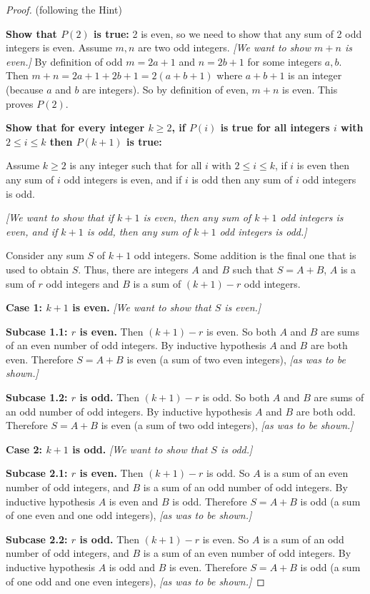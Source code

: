 \documentclass[14pt]{extarticle}
\begin{document}
\begin{proof}
(following the Hint)

{\bf Show that $P(2)$ is true:} 2 is even, so we need to show that any sum of 2 odd integers is even. Assume $m, n$ are two odd integers. 
{\it [We want to show $m+n$ is even.]} 
By definition of odd $m = 2a+1$ and $n = 2b+1$ for some integers $a,b$. 
Then $m+n = 2a+1 + 2b + 1 = 2(a+b+1)$ where $a+b+1$ is an integer (because $a$ and $b$ are integers). 
So by definition of even, $m+n$ is even. This proves $P(2)$.

{\bf Show that for every integer $k \geq 2$, if $P(i)$ is true for all integers $i$ with $2 \leq i \leq k$ then $P(k+1)$ is true:}

Assume $k \geq 2$ is any integer such that for all $i$ with $2 \leq i \leq k$, if $i$ is even then any sum of $i$ odd integers is even, and if $i$ is odd then any sum of $i$ odd integers is odd.

{\it [We want to show that if $k+1$ is even, then any sum of $k+1$ odd integers is even, and if $k+1$ is odd, then any sum of $k+1$ odd integers is odd.]}

Consider any sum $S$ of $k+1$ odd integers.
Some addition is the final one that is used to obtain $S$.
Thus, there are integers $A$ and $B$ such that $S = A + B$,
$A$ is a sum of $r$ odd integers and $B$ is a sum of $(k + 1) - r$ odd integers.

{\bf Case 1: $k+1$ is even.} {\it [We want to show that $S$ is even.]} 

{\bf Subcase 1.1: $r$ is even.}
Then $(k+1) - r$ is even. So both $A$ and $B$ are sums of an even number of odd integers.
By inductive hypothesis $A$ and $B$ are both even.
Therefore $S = A + B$ is even (a sum of two even integers),
{\it [as was to be shown.]}

{\bf Subcase 1.2: $r$ is odd.}
Then $(k+1) - r$ is odd. So both $A$ and $B$ are sums of an odd number of odd integers.
By inductive hypothesis $A$ and $B$ are both odd.
Therefore $S = A + B$ is even (a sum of two odd integers),
{\it [as was to be shown.]}

{\bf Case 2: $k+1$ is odd.} {\it [We want to show that $S$ is odd.]} 

{\bf Subcase 2.1: $r$ is even.}
Then $(k+1) - r$ is odd. 
So $A$ is a sum of an even number of odd integers, and 
$B$ is a sum of an odd number of odd integers.
By inductive hypothesis $A$ is even and $B$ is odd.
Therefore $S = A + B$ is odd 
(a sum of one even and one odd integers),
{\it [as was to be shown.]}

{\bf Subcase 2.2: $r$ is odd.}
Then $(k+1) - r$ is even. 
So $A$ is a sum of an odd number of odd integers, and 
$B$ is a sum of an even number of odd integers.
By inductive hypothesis $A$ is odd and $B$ is even.
Therefore $S = A + B$ is odd 
(a sum of one odd and one even integers),
{\it [as was to be shown.]}
\end{proof}
\end{document}

